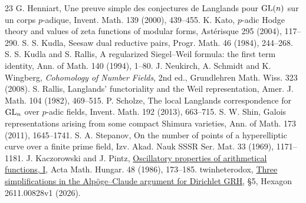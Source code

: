 \documentclass[letterpaper,11pt]{article}
\begin{document}
\begin{thebibliography}{23}
 G. Henniart, Une preuve simple des conjectures de Langlands pour \({\rm GL}(n)\) sur un corps \(p\)-adique, Invent. Math. 139 (2000), 439--455.
 K. Kato, \(p\)-adic Hodge theory and values of zeta functions of modular forms, Ast\'erisque 295 (2004), 117--290.
 S. S. Kudla, Seesaw dual reductive pairs, Progr. Math. 46 (1984), 244--268.
 S. S. Kudla and S. Rallis, A regularized Siegel--Weil formula: the first term identity, Ann. of Math. 140 (1994), 1--80.
 J. Neukirch, A. Schmidt and K. Wingberg, \emph{Cohomology of Number Fields}, 2nd ed., Grundlehren Math. Wiss. 323 (2008).
 S. Rallis, Langlands' functoriality and the Weil representation, Amer. J. Math. 104 (1982), 469--515.
 P. Scholze, The local Langlands correspondence for \({\rm GL}_n\) over \(p\)-adic fields, Invent. Math. 192 (2013), 663--715.
 S. W. Shin, Galois representations arising from some compact Shimura varieties, Ann. of Math. 173 (2011), 1645--1741.
 S. A. Stepanov, On the number of points of a hyperelliptic curve over a finite prime field, Izv. Akad. Nauk SSSR Ser. Mat. 33 (1969), 1171--1181.
 J. Kaczorowski and J. Pintz, \href{https://doi.org/10.1007/BF01949062}{Oscillatory properties of arithmetical functions, I}, Acta Math. Hungar. 48 (1986), 173--185.
 twinheterodox, \href{https://hexagonmath.org/pdf/2611.00828v1}{Three simplifications in the Alp\"oge--Claude argument for Dirichlet GRH}, \S5, Hexagon 2611.00828v1 (2026).
\end{thebibliography}
\end{document}
